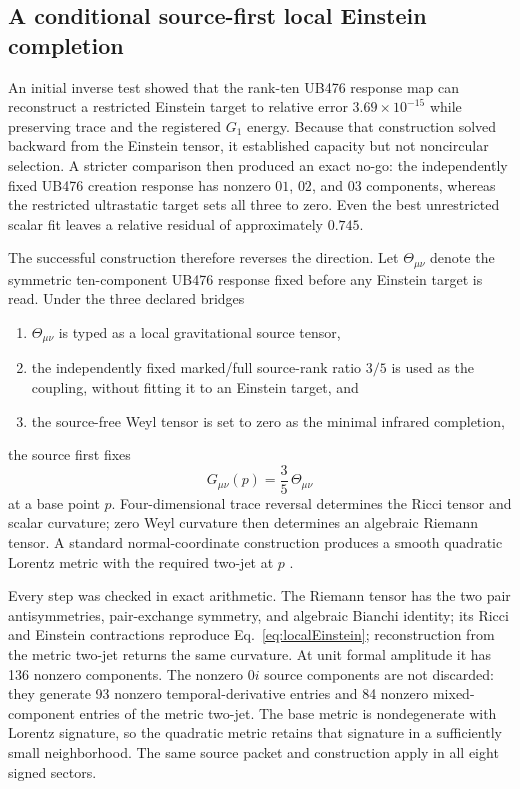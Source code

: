 \documentclass[11pt]{article}
\theoremstyle{definition}
\theoremstyle{remark}
\begin{document}
\subsection{A conditional source-first local Einstein completion}

An initial inverse test showed that the rank-ten UB476 response map can reconstruct a restricted Einstein target to relative error $3.69\times10^{-15}$ while preserving trace and the registered $G_1$ energy. Because that construction solved backward from the Einstein tensor, it established capacity but not noncircular selection. A stricter comparison then produced an exact no-go: the independently fixed UB476 creation response has nonzero $01$, $02$, and $03$ components, whereas the restricted ultrastatic target sets all three to zero. Even the best unrestricted scalar fit leaves a relative residual of approximately $0.745$.

The successful construction therefore reverses the direction. Let $\Theta_{\mu\nu}$ denote the symmetric ten-component UB476 response fixed before any Einstein target is read. Under the three declared bridges
\begin{enumerate}[label=(\roman*)]
\item $\Theta_{\mu\nu}$ is typed as a local gravitational source tensor,
\item the independently fixed marked/full source-rank ratio $3/5$ is used as the coupling, without fitting it to an Einstein target, and
\item the source-free Weyl tensor is set to zero as the minimal infrared completion,
\end{enumerate}
the source first fixes
\begin{equation}\label{eq:localEinstein}
 G_{\mu\nu}(p)=\frac35\,\Theta_{\mu\nu}
\end{equation}
at a base point $p$. Four-dimensional trace reversal determines the Ricci tensor and scalar curvature; zero Weyl curvature then determines an algebraic Riemann tensor. A standard normal-coordinate construction produces a smooth quadratic Lorentz metric with the required two-jet at $p$ \cite{wald1984}.

Every step was checked in exact arithmetic. The Riemann tensor has the two pair antisymmetries, pair-exchange symmetry, and algebraic Bianchi identity; its Ricci and Einstein contractions reproduce Eq.~\eqref{eq:localEinstein}; reconstruction from the metric two-jet returns the same curvature. At unit formal amplitude it has 136 nonzero components. The nonzero $0i$ source components are not discarded: they generate 93 nonzero temporal-derivative entries and 84 nonzero mixed-component entries of the metric two-jet. The base metric is nondegenerate with Lorentz signature, so the quadratic metric retains that signature in a sufficiently small neighborhood. The same source packet and construction apply in all eight signed sectors.
\end{document}
